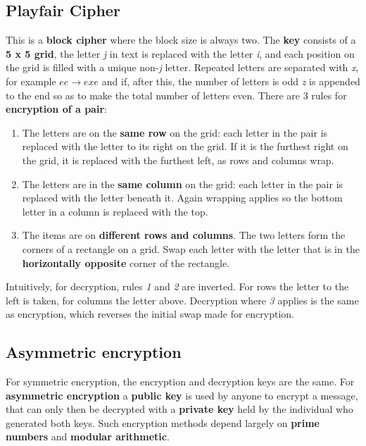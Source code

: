 \documentclass{article}
\begin{document}
\subsection{Playfair Cipher}
This is a \textbf{block cipher} where the block size is always two. The \textbf{key} consists of a \textbf{5 x 5 grid}, the letter \textit{j} in text is replaced with the letter \textit{i}, and each position on the grid is filled with a unique non-\textit{j} letter. Repeated letters are separated with \textit{x}, for example $ ee \rightarrow exe $ and if, after this, the number of letters is odd \textit{z} is appended to the end so as to make the total number of letters even. There are 3 rules for \textbf{encryption of a pair}:
\begin{enumerate}
	\item The letters are on the \textbf{same row} on the grid: each letter in the pair is replaced with the letter to its right on the grid. If it is the furthest right on the grid, it is replaced with the furthest left, as rows and columns wrap.
	\item The letters are in the \textbf{same column} on the grid: each letter in the pair is replaced with the letter beneath it. Again wrapping applies so the bottom letter in a column is replaced with the top.
	\item The items are on \textbf{different rows and columns}. The two letters form the corners of a rectangle on a grid. Swap each letter with the letter that is in the \textbf{horizontally opposite} corner of the rectangle.
\end{enumerate}
Intuitively, for decryption, rules \textit{1} and \textit{2} are inverted. For rows the letter to the left is taken, for columns the letter above. Decryption where \textit{3} applies is the same as encryption, which reverses the initial swap made for encryption.

\subsection{Asymmetric encryption}
For symmetric encryption, the encryption and decryption keys are the same. For \textbf{asymmetric encryption} a \textbf{public key} is used by anyone to encrypt a message, that can only then be decrypted with a \textbf{private key} held by the individual who generated both keys. Such encryption methods depend largely on \textbf{prime numbers} and \textbf{modular arithmetic}.
\end{document}
